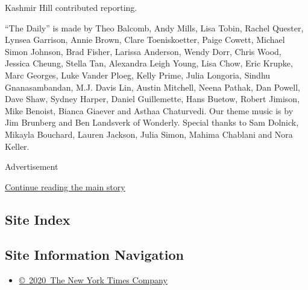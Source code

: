 Kashmir Hill contributed reporting.

``The Daily'' is made by Theo Balcomb, Andy Mills, Lisa Tobin, Rachel
Quester, Lynsea Garrison, Annie Brown, Clare Toeniskoetter, Paige
Cowett, Michael Simon Johnson, Brad Fisher, Larissa Anderson, Wendy
Dorr, Chris Wood, Jessica Cheung, Stella Tan, Alexandra Leigh Young,
Lisa Chow, Eric Krupke, Marc Georges, Luke Vander Ploeg, Kelly Prime,
Julia Longoria, Sindhu Gnanasambandan, M.J. Davis Lin, Austin Mitchell,
Neena Pathak, Dan Powell, Dave Shaw, Sydney Harper, Daniel Guillemette,
Hans Buetow, Robert Jimison, Mike Benoist, Bianca Giaever and Asthaa
Chaturvedi. Our theme music is by Jim Brunberg and Ben Landsverk of
Wonderly. Special thanks to Sam Dolnick, Mikayla Bouchard, Lauren
Jackson, Julia Simon, Mahima Chablani and Nora Keller.

Advertisement

\protect\hyperlink{after-bottom}{Continue reading the main story}

\hypertarget{site-index}{%
\subsection{Site Index}\label{site-index}}

\hypertarget{site-information-navigation}{%
\subsection{Site Information
Navigation}\label{site-information-navigation}}

\begin{itemize}
\tightlist
\item
  \href{https://help.nytimes.com/hc/en-us/articles/115014792127-Copyright-notice}{©~2020~The
  New York Times Company}
\end{itemize}


